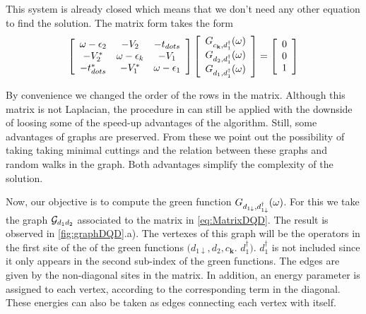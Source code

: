  This system is already closed which means that we don't need any other equation to find the solution. The matrix form takes the form
 \begin{equation}
\left[\begin{array}{ccc}
\omega-\epsilon_{2} & -V_{2} & -t_{dots}\\
-V_{2}^{*} & \omega-\epsilon_{k} & -V_{1}\\
-t_{dots}^{*} & -V_{1}^{*} & \omega-\epsilon_{1}
\end{array}\right]\left[\begin{array}{c}
G_{c_{\mathbf{k}},d_{1}^{\dagger}}(\omega)\\
G_{d_2,d_{1}^{\dagger}}(\omega)\\
G_{d_{1},d_{1}^{\dagger}}(\omega)
\end{array}\right]=\left[\begin{array}{c}
0\\
0\\
1
\end{array}\right]
\label{eq:MatrixDQD}
 \end{equation}
 
\noindent By convenience we changed the order of the rows in the matrix. Although this matrix is not Laplacian, the procedure in \cite{spielman10} can still be applied with the downside of loosing some of the speed-up advantages of the algorithm. Still, some advantages of graphs are preserved. From these we point out  the possibility of taking taking minimal cuttings and the relation between these graphs and random walks in the graph. Both advantages simplify the complexity of the solution. 
 
Now, our objective is to compute the green function  $G_{d_{1\downarrow},d_{1\downarrow}^{\dagger}}(\omega)$.   For this we take the graph $\mathcal{G}_{d_1d_2}$ associated to the matrix in \eqref{eq:MatrixDQD}. The result is observed in \ref{fig:graphDQD}.a).  The vertexes of this graph will be the operators in the first site of the of the green functions  $(d_{1\downarrow},d_{2},c_{\boldsymbol{k}}$. $d_1^\dagger)$. $d^\dagger_1$ is not included since it only appears in the second sub-index of the green functions. The edges are given by the non-diagonal sites in the matrix. In addition, an energy parameter is assigned to each vertex, according to the corresponding term in the diagonal. These energies can also be taken as edges connecting each vertex with itself. 

